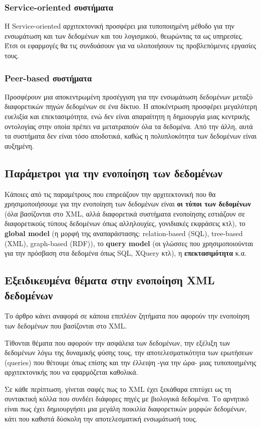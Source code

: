         \subsubsection{Service-oriented συστήματα}
            Η Service-oriented αρχιτεκτονική προσφέρει μια τυποποιημένη μέθοδο για την ενσωμάτωση και των δεδομένων και του λογισμικού, θεωρώντας τα ως υπηρεσίες.
            Έτσι οι εφαρμογές θα τις συνδυάσουν για να υλοποιήσουν τις προβλεπόμενες εργασίες τους.

        \subsubsection{Peer-based συστήματα}
            Προσφέρουν μια αποκεντρωμένη προσέγγιση για την ενσωμάτωση δεδομένων μεταξύ διαφορετικών πηγών δεδομένων σε ένα δίκτυο.
            Η αποκέντρωση προσφέρει μεγαλύτερη ευελιξία και επεκτασιμότητα, ενώ δεν είναι απαραίτητη η δημιουργία μιας κεντρικής οντολογίας στην οποία πρέπει να μετατραπούν όλα τα δεδομένα.
            Από την άλλη, αυτά τα συστήματα δεν είναι τόσο αποδοτικά, καθώς η πολυπλοκότητα των δεδομένων είναι αυξημένη.


    \subsection{Παράμετροι για την ενοποίηση των δεδομένων}
        Κάποιες από τις παραμέτρους που επηρεάζουν την αρχιτεκτονική που θα χρησιμοποιήσουμε για την ενοποίηση των δεδομένων είναι \textbf{οι τύποι των δεδομένων} (όλα βασίζονται στο XML, αλλά διαφορετικά συστήματα ενοποίησης εστιάζουν σε διαφορετικούς τύπους δεδομένων όπως αλληλουχίες, γονιδιακές εκφράσεις κτλ),
            το \textbf{global model} (η μορφή της αναπαράστασης: relation-based (SQL), tree-based (XML), graph-based (RDF)), το \textbf{query model} (οι γλώσσες που χρησιμοποιούνται για την πρόσβαση στα δεδομένα όπως SQL, XQuery κτλ), η \textbf{επεκτασιμότητα} κ.α.

    \subsection{Εξειδικευμένα θέματα στην ενοποίηση XML δεδομένων}
        Το άρθρο κάνει αναφορά σε κάποια επιπλέον ζητήματα που αφορούν την ενοποίηση των δεδομένων που βασίζονται στο XML.

        Τίθονται θέματα που αφορούν την ασφάλεια των δεδομένων, την εξέλιξη των δεδομένων λόγω της δυναμικής φύσης τους, την αποτελεσματικότητα των ερωτήσεων (queries) που θέτουμε όπως επίσης και την έλλειψη -για την ώρα- μιας τυποποιημένης αρχιτεκτονικής που να εφαρμόζεται καθολικά.

    Σε κάθε περίπτωση, γίνεται σαφές πως το XML έχει ξεκάθαρα επιτύχει ως τη συντακτική κόλλα που συνδέει διάφορες πηγές με βιολογικά δεδομένα.
    Το αρνητικό είναι πως έχει δημιουργήσει μια μεγάλη ποικιλία διαφορετικών μορφών δεδομένων, κάτι που καθιστά δύσκολη την αποτελεσματική ενσωμάτωσή τους.
